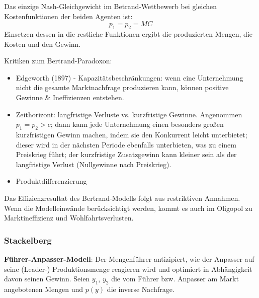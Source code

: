 \begin{kr}[Betrand]
	Das einzige Nash-Gleichgewicht im Betrand-Wettbewerb bei gleichen Kostenfunktionen der beiden Agenten ist:
	$$ p_1 = p_2 = MC $$	
	Einsetzen dessen in die restliche Funktionen ergibt die produzierten Mengen, die Kosten und den Gewinn.
\end{kr}

Kritiken zum Bertrand-Paradoxon:

\begin{itemize}
	\item Edgeworth (1897) -  Kapazitätsbeschränkungen: wenn eine Unternehmung nicht die gesamte Marktnachfrage produzieren kann, können positive Gewinne \& Ineffizienzen entstehen.
	\item Zeithorizont: langfristige Verluste vs. kurzfristige Gewinne. Angenommen $p_1 = p_2 > c$; dann kann jede Unternehmung einen besonders großen kurzfristigen Gewinn machen, indem sie den Konkurrent leicht unterbietet; dieser wird in der nächsten Periode ebenfalls unterbieten, was zu einem  Preiskrieg führt; der kurzfristige Zusatzgewinn kann kleiner sein als der langfristige Verlust (Nullgewinne nach Preiskrieg).
	\item Produktdifferenzierung
\end{itemize}

Das Effizienzresultat des Bertrand-Modells folgt aus restriktiven Annahmen. Wenn die Modelleinwände berücksichtigt werden, kommt es auch im Oligopol zu Marktineffizienz und Wohlfahrtsverlusten.

\subsubsection*{Stackelberg}

\textbf{Führer-Anpasser-Modell}: Der Mengenführer antizipiert, wie der Anpasser auf seine (Leader-) Produktionsmenge reagieren wird und optimiert in Abhängigkeit davon seinen Gewinn. Seien $y_1$, $y_2$ die vom Führer bzw. Anpasser am Markt angebotenen Mengen und $p(y)$ die inverse Nachfrage.

